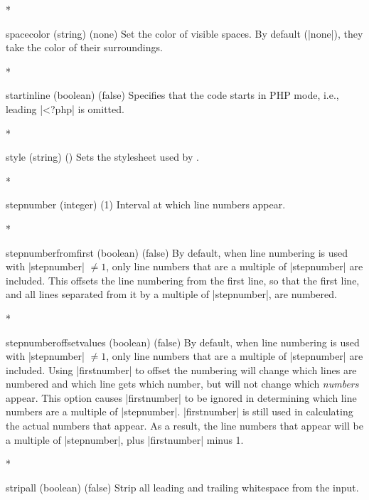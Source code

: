 \begin{paracol}{2}
\begin{optionlist}
\switchcolumn[0]*%

\item[spacecolor (string) (none)]
Set the color of visible spaces.  By default (|none|), they take the color of their surroundings.
\switchcolumn

\switchcolumn[0]*%

  \item[startinline (boolean) (false)] 
    Specifies that the code starts in PHP mode, i.e., leading |<?php| is omitted.
    \switchcolumn

\switchcolumn[0]*%
  \item[style] (string) ()
    Sets the stylesheet used by .
    \switchcolumn

\switchcolumn[0]*%
  \item[stepnumber (integer) (1)]
    Interval at which line numbers appear.
    \switchcolumn

    \switchcolumn[0]*%

\item[stepnumberfromfirst (boolean) (false)]
By default, when line numbering is used with |stepnumber| $\ne 1$, only line numbers that are a multiple of |stepnumber| are included.  This offsets the line numbering from the first line, so that the first line, and all lines separated from it by a multiple of |stepnumber|, are numbered.

\switchcolumn

\switchcolumn[0]*%
\item[stepnumberoffsetvalues (boolean) (false)]
By default, when line numbering is used with |stepnumber| $\ne 1$, only line numbers that are a multiple of |stepnumber| are included.  Using |firstnumber| to offset the numbering will change which lines are numbered and which line gets which number, but will not change which \emph{numbers} appear.  This option causes |firstnumber| to be ignored in determining which line numbers are a multiple of |stepnumber|.  |firstnumber| is still used in calculating the actual numbers that appear.  As a result, the line numbers that appear will be a multiple of |stepnumber|, plus |firstnumber| minus 1.
\switchcolumn

\switchcolumn[0]*%

  \item[stripall (boolean) (false)]
    Strip all leading and trailing whitespace from the input.
    \switchcolumn


\end{optionlist}
\end{paracol}
